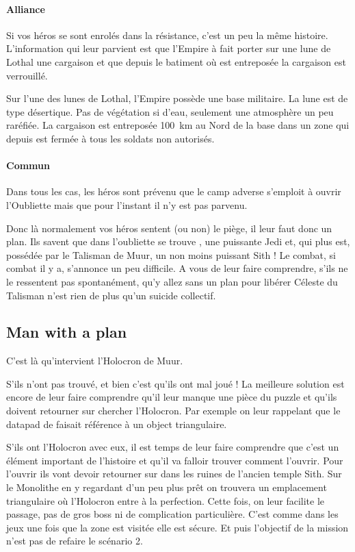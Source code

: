 \paragraph{Alliance}
Si vos héros se sont enrolés dans la résistance, c’est un peu la même histoire. L’information qui leur parvient est que l’Empire à fait porter sur une lune de Lothal une cargaison et que depuis le batiment où est entreposée la cargaison est verrouillé. 

Sur l’une des lunes de Lothal, l’Empire possède une base militaire. La lune est de type désertique. Pas de végétation si d’eau, seulement une atmosphère un peu raréfiée. La cargaison est entreposée 100~km au Nord de la base dans un zone qui depuis est fermée à tous les soldats non autorisés.

\paragraph{Commun}
Dans tous les cas, les héros sont prévenu que le camp adverse s’emploit à ouvrir l’Oubliette mais que pour l’instant il n’y est pas parvenu.

Donc là normalement vos héros sentent (ou non) le piège, il leur faut donc un plan. Ils savent que dans l’oubliette se trouve , une puissante Jedi et, qui plus est, possédée par le Talisman de Muur, un non moins puissant Sith ! Le combat, si combat il y a, s’annonce un peu difficile. A vous de leur faire comprendre, s’ils ne le ressentent pas spontanément, qu’y allez sans un plan pour libérer Céleste du Talisman n’est rien de plus qu’un suicide collectif.

\subsection{Man with a plan}
C’est là qu’intervient l’Holocron de Muur.

S’ils n’ont pas trouvé, et bien c’est qu’ils ont mal joué ! La meilleure solution est encore de leur faire comprendre qu’il leur manque une pièce du puzzle et qu’ils doivent retourner sur  chercher l’Holocron. Par exemple on leur rappelant que le datapad de  faisait référence à un object triangulaire.

S’ils ont l’Holocron avec eux, il est temps de leur faire comprendre que c’est un élément important de l’histoire et qu’il va falloir trouver comment l’ouvrir. Pour l’ouvrir ils vont devoir retourner sur  dans les ruines de l’ancien temple Sith. Sur le Monolithe en y regardant d’un peu plus prêt on trouvera un emplacement triangulaire où l’Holocron entre à la perfection. Cette fois, on leur facilite le passage, pas de gros boss ni de complication particulière. C’est comme dans les jeux une fois que la zone est visitée elle est sécure. Et puis l’objectif de la mission n’est pas de refaire le scénario 2.

